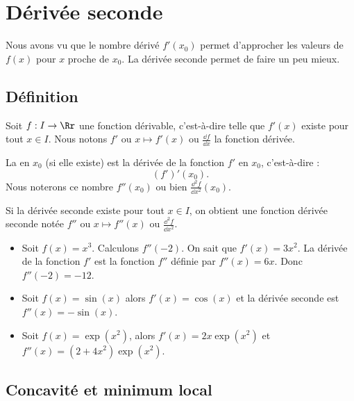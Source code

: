 \documentclass[11pt,class=report,crop=false]{standalone}
\begin{document}
\section{Dérivée seconde}


Nous avons vu que le nombre dérivé $f'(x_0)$ permet d'approcher les valeurs de $f(x)$ pour $x$ proche de $x_0$. La dérivée seconde permet de faire un peu mieux.

  
\subsection{Définition}

Soit $f : I \to \Rr$ une fonction dérivable, c'est-à-dire telle que $f'(x)$ existe pour tout $x \in I$. Nous notons $f'$ ou $x \mapsto f'(x)$ ou $\frac{\dd f}{\dd x}$ la fonction dérivée. 

\begin{definition}
La  en $x_0$ (si elle existe) est la dérivée de la fonction $f'$ en $x_0$, c'est-à-dire :
$$(f')'(x_0).$$
Nous noterons ce nombre $f''(x_0)$ ou bien $\frac{\dd^2 f}{\dd x^2}(x_0)$.
\end{definition}

Si la dérivée seconde existe pour tout $x\in I$, on obtient une fonction dérivée seconde notée $f''$ ou $x \mapsto f''(x)$ ou $\frac{\dd^2 f}{\dd x^2}$.

\begin{exemple}
\sauteligne
\begin{itemize}
  \item Soit $f(x)= x^3$. Calculons $f''(-2)$. On sait que $f'(x) = 3x^2$.
  La dérivée de la fonction $f'$ est la fonction $f''$ définie par $f''(x) = 6x$.
  Donc $f''(-2) = -12$.
  
  \item Soit $f(x) = \sin(x)$ alors $f'(x) = \cos(x)$ et la dérivée seconde est $f''(x) = - \sin(x)$.
  
  \item Soit $f(x) = \exp(x^2)$, alors $f'(x) = 2x \exp(x^2)$ et $f''(x) = (2 + 4x^2)\exp(x^2)$. 
\end{itemize}
\end{exemple}



\subsection{Concavité et minimum local}
\end{document}

